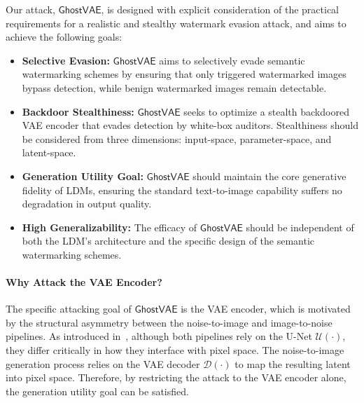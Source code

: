 \documentclass[letterpaper,twocolumn,10pt]{article}
\newcommand{\mg}{$\mathsf{GhostVAE}$\xspace}
\newcommand{\mypara}[1]{\smallskip\noindent{\bf {#1}.} \xspace}
\begin{document}
\mypara{Design Goal}
Our attack, \mg, is designed with explicit consideration of the practical requirements for a realistic and stealthy watermark evasion attack, and aims to achieve the following goals:
\begin{itemize}

\item \textbf{Selective Evasion:}
\mg aims to selectively evade semantic watermarking schemes by ensuring that only triggered watermarked images bypass detection, while benign watermarked images remain detectable.

\item \textbf{Backdoor Stealthiness:}
\mg seeks to optimize a stealth backdoored VAE encoder that evades detection by white-box auditors.
Stealthiness should be considered from three dimensions: input-space, parameter-space, and latent-space.

\item \textbf{Generation Utility Goal:}
\mg should maintain the core generative fidelity of LDMs, ensuring the standard text-to-image capability suffers no degradation in output quality.

\item \textbf{High Generalizability:}
The efficacy of \mg should be independent of both the LDM's architecture and the specific design of the semantic watermarking schemes.

\end{itemize}


\paragraph{Why Attack the VAE Encoder?}
The specific attacking goal of \mg is the VAE encoder, which is motivated by the structural asymmetry between the noise-to-image and image-to-noise pipelines.
As introduced in~, although both pipelines rely on the U-Net $\mathcal{U}(\cdot)$, they differ critically in how they interface with pixel space.
The noise-to-image generation process relies on the VAE decoder $\mathcal{D}(\cdot)$ to map the resulting latent into pixel space.
Therefore, by restricting the attack to the VAE encoder alone, the generation utility goal can be satisfied.
\end{document}
